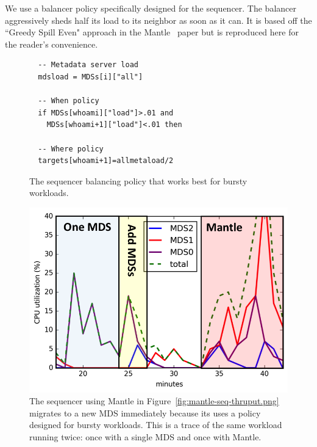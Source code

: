 \documentclass[10pt,twocolumn]{article}
\begin{document}
We use a balancer policy specifically designed for the sequencer. The balancer aggressively sheds half its load to its neighbor as soon as it can.  It is based
off the ``Greedy Spill Even" approach in the Mantle~\cite{sevilla:sc15-mantle} paper
but is reproduced here for the reader's convenience. 

\begin{figure}[]
\begin{lstlisting}
  -- Metadata server load
  mdsload = MDSs[i]["all"]
  
  -- When policy
  if MDSs[whoami]["load"]>.01 and 
    MDSs[whoami+1]["load"]<.01 then
    
  -- Where policy
  targets[whoami+1]=allmetaload/2
\end{lstlisting}
    \caption{The sequencer balancing policy that works best for bursty workloads. \label{listing:greedy-spill}}
\end{figure}

\begin{figure}[t!]
\centering
\includegraphics{figures/mantle-cpu-utilization-annotate.png}
\caption{The sequencer using Mantle in Figure~\ref{fig:mantle-seq-thruput.png}
migrates to a new MDS immediately because its uses a policy designed for bursty
workloads. This is a trace of the same workload running twice: once with a
single MDS and once with Mantle.}
\label{fig:mantle-cpu-utilization}
\end{figure}
\end{document}
